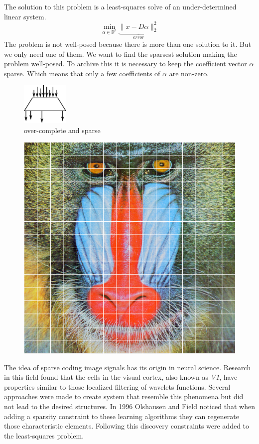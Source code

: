 The solution to this problem is a least-squares solve of an under-determined
linear system.
\begin{equation}
\min_{\alpha\in\mathbb{R}^{p}} \underbrace{\lVert x - D\alpha
\rVert^{2}_{2}}_{error} \label{eq:problem}
\end{equation}
The problem is not well-posed because there is more than one
solution to it. %
But we only need one of them. We want to find the sparsest
solution making the problem well-posed. To archive this it is necessary to keep
the coefficient vector $\alpha$ sparse. Which means that only a few coefficients
of $\alpha$ are non-zero. 
\begin{figure}[h]
\centering
\includegraphics[width = 0.20\textwidth]{images/sparse.pdf}
\caption{over-complete and sparse}
\label{fig:sparse}
\end{figure}

\begin{figure}[h]
\centering
\includegraphics[scale = 0.25]{images/segmentation.png}
\caption{}
\label{fig:sparse}
\end{figure}
The idea of sparse coding image signals has its origin in neural science. 
Research in this field found that the cells in the visual cortex, also known as
\emph{V1}, have properties similar to those localized filtering of wavelets
functions. Several approaches were made to create system that resemble this
phenomena but did not lead to the desired structures. In 1996 Olshausen and
Field\cite{Olshausen1996} noticed that when adding a sparsity constraint to
these learning algorithms they can regenerate those characteristic elements.
Following this discovery constraints were added to the least-squares problem.


